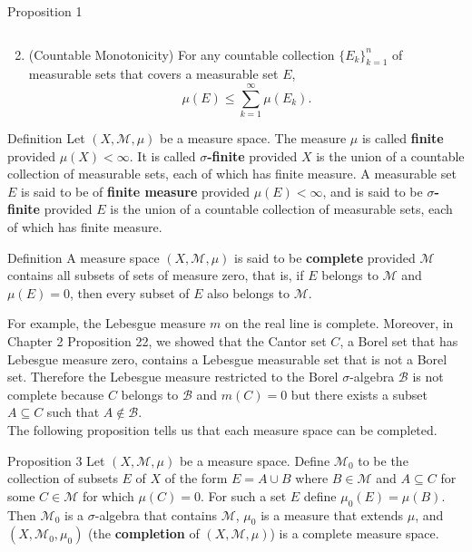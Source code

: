 \begin{flushleft}
\begin{namedthm*}{Proposition 1}
\begin{enumerate}[\indent {}]
\[			\]
			\item (Countable Monotonicity) For any countable collection $\{E_k\}_{k=1}^n$ of measurable sets that covers a measurable set $E$,
			\[
				\mu(E)\le\sum_{k=1}^\infty\mu(E_k).	
			\]
		\end{enumerate}
	\end{namedthm*}
	\begin{namedthm*}{Definition}
		Let $(X,\mathcal{M},\mu)$ be a measure space. 
		The measure $\mu$ is called \textbf{finite} provided $\mu(X)<\infty$. 
		It is called \textbf{$\sigma$-finite} provided $X$ is the union of a countable collection of measurable sets, each of which has finite measure.
		A measurable set $E$ is said to be of \textbf{finite measure} provided $\mu(E)<\infty$, and is said to be \textbf{$\sigma$-finite} provided $E$ is the union of a countable collection of measurable sets, each of which has finite measure.
	\end{namedthm*}
	\begin{namedthm*}{Definition}
		A measure space $(X,\mathcal{M},\mu)$ is said to be \textbf{complete} provided $\mathcal{M}$ contains all subsets of sets of measure zero, that is, if $E$ belongs to $\mathcal{M}$ and $\mu(E)=0$, then every subset of $E$ also belongs to $\mathcal{M}$.
	\end{namedthm*}
	For example, the Lebesgue measure $m$ on the real line is complete. 
	Moreover, in Chapter 2 Proposition 22, we showed that the Cantor set $C$, a Borel set that has Lebesgue measure zero, contains a Lebesgue measurable set that is not a Borel set.
	Therefore the Lebesgue measure restricted to the Borel $\sigma$-algebra $\mathcal{B}$ is not complete because $C$ belongs to $\mathcal{B}$ and $m(C)=0$ but there exists a subset $A\subseteq C$ such that $A\notin\mathcal{B}$.\\
	\medskip
	The following proposition tells us that each measure space can be completed.
	\begin{namedthm*}{Proposition 3}
		Let $(X,\mathcal{M},\mu)$ be a measure space.
		Define $\mathcal{M}_0$ to be the collection of subsets $E$ of $X$ of the form $E=A\cup B$ where $B\in\mathcal{M}$ and $A\subseteq C$ for some $C\in\mathcal{M}$ for which $\mu(C)=0$.
		For such a set $E$ define $\mu_0(E)=\mu(B)$. 
		Then $\mathcal{M}_0$ is a $\sigma$-algebra that contains $\mathcal{M}$, $\mu_0$ is a measure that extends $\mu$, and $(X,\mathcal{M}_0,\mu_0)$ (the \textbf{completion} of $(X,\mathcal{M},\mu)$) is a complete measure space.
	\end{namedthm*}
\end{flushleft}
